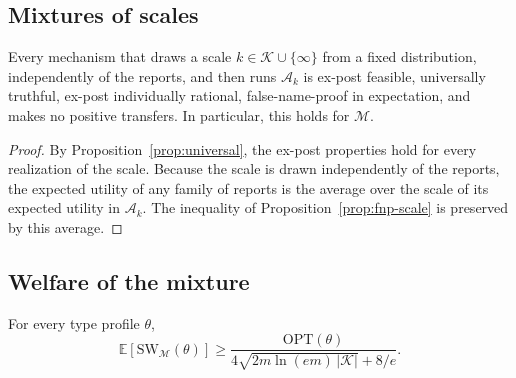 \documentclass[format=acmsmall, review=false]{acmart}
\newcommand{\E}{\mathbb{E}}
\newcommand{\OPT}{\mathrm{OPT}}
\newcommand{\SW}{\mathrm{SW}}
\begin{document}
\subsection{Mixtures of scales}
\label{sec:rand-mixture}

\begin{corollary}\label{cor:mixture}
Every mechanism that draws a scale
\(k\in\mathcal K\cup\{\infty\}\) from a fixed distribution,
independently of the reports, and then runs \(\mathcal A_k\) is
ex-post feasible, universally truthful, ex-post individually
rational, false-name-proof in expectation, and makes no positive
transfers. In particular, this holds for \(\mathcal M\).
\end{corollary}

\begin{proof}
By Proposition~\ref{prop:universal}, the ex-post properties hold
for every realization of the scale. Because the scale is drawn
independently of the reports, the expected utility of any family
of reports is the average over the scale of its expected utility
in \(\mathcal A_k\). The inequality of
Proposition~\ref{prop:fnp-scale} is preserved by this average.
\end{proof}

\subsection{Welfare of the mixture}
\label{sec:rand-welfare}

\begin{proposition}
\label{prop:welfare}
For every type profile \(\theta\),
\[
\E[\SW_{\mathcal M}(\theta)]
\ge
\frac{\OPT(\theta)}{
4\sqrt{2m\ln(em)\,|\mathcal K|}+8/e}.
\]
\end{proposition}
\end{document}
